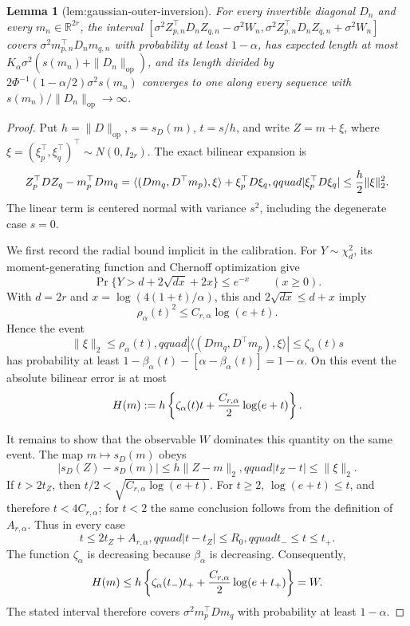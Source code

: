 \documentclass{article}
\newtheorem{lemma}{Lemma}
\begin{document}
\begin{lemma}[lem:gaussian-outer-inversion]\label{lem:gaussian-outer-inversion}
For every invertible diagonal \(D_n\) and every \(m_n\in\mathbb R^{2r}\), the interval \([\sigma^2Z_{p,n}^{\top}D_nZ_{q,n}-\sigma^2W_n,\sigma^2Z_{p,n}^{\top}D_nZ_{q,n}+\sigma^2W_n]\) covers \(\sigma^2m_{p,n}^{\top}D_nm_{q,n}\) with probability at least \(1-\alpha\), has expected length at most \(K_\alpha\sigma^2(s(m_n)+\|D_n\|_{\mathrm{op}})\), and its length divided by \(2\Phi^{-1}(1-\alpha/2)\sigma^2s(m_n)\) converges to one along every sequence with \(s(m_n)/\|D_n\|_{\mathrm{op}}\to\infty\).
\end{lemma}
\begin{proof}
Put \(h=\|D\|_{\mathrm{op}}\), \(s=s_D(m)\), \(t=s/h\), and write \(Z=m+\xi\), where \(\xi=(\xi_p^{\top},\xi_q^{\top})^{\top}\sim N(0,I_{2r})\).  The exact bilinear expansion is
\[
 Z_p^{\top}DZ_q-m_p^{\top}Dm_q
 =\langle(Dm_q,D^{\top}m_p),\xi\rangle+\xi_p^{\top}D\xi_q,qquad
 |\xi_p^{\top}D\xi_q|\le {h\over2}\|\xi\|_2^2.
\]
The linear term is centered normal with variance \(s^2\), including the degenerate case \(s=0\).

We first record the radial bound implicit in the calibration.  For \(Y\sim\chi^2_d\), its moment-generating function and Chernoff optimization give
\[
 \Pr\{Y>d+2\sqrt{dx}+2x\}\le e^{-x}\qquad(x\ge0).
\]
With \(d=2r\) and \(x=\log(4(1+t)/\alpha)\), this and \(2\sqrt{dx}\le d+x\) imply
\[
 \rho_\alpha(t)^2\le C_{r,\alpha}\log(e+t).
\]
Hence the event
\[
 \|\xi\|_2\le\rho_\alpha(t),qquad
 |\langle(Dm_q,D^{\top}m_p),\xi\rangle|
 \le\zeta_\alpha(t)s
\]
has probability at least \(1-\beta_\alpha(t)-[\alpha-\beta_\alpha(t)]=1-\alpha\).  On this event the absolute bilinear error is at most
\[
 H(m):=h\left\{\zeta_\alpha(t)t+{C_{r,\alpha}\over2}\log(e+t)\right\}.
\]

It remains to show that the observable \(W\) dominates this quantity on the same event.  The map \(m\mapsto s_D(m)\) obeys
\[
 |s_D(Z)-s_D(m)|\le h\|Z-m\|_2,qquad |t_Z-t|\le\|\xi\|_2.
\]
If \(t>2t_Z\), then \(t/2<\sqrt{C_{r,\alpha}\log(e+t)}\).  For \(t\ge2\), \(\log(e+t)\le t\), and therefore \(t<4C_{r,\alpha}\); for \(t<2\) the same conclusion follows from the definition of \(A_{r,\alpha}\).  Thus in every case
\[
 t\le2t_Z+A_{r,\alpha},qquad
 |t-t_Z|\le R_0,qquad t_-\le t\le t_+.
\]
The function \(\zeta_\alpha\) is decreasing because \(\beta_\alpha\) is decreasing.  Consequently,
\[
 H(m)\le h\left\{\zeta_\alpha(t_-)t_+
 +{C_{r,\alpha}\over2}\log(e+t_+)\right\}=W.
\]
The stated interval therefore covers \(\sigma^2m_p^{\top}Dm_q\) with probability at least \(1-\alpha\).


\end{proof}
\end{document}
